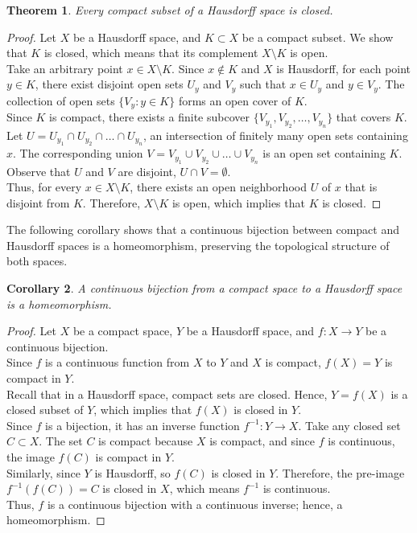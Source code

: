 \documentclass[12pt, reqno]{amsart}
\newtheorem{theorem}{Theorem}[section]
\newtheorem{corollary}[theorem]{Corollary}
\theoremstyle{definition}
\numberwithin{equation}{section}
\newcommand{\tabb}{\hspace*{1cm}}
\begin{document}
\begin{theorem}
 Every compact subset of a Hausdorff space is closed.
\end{theorem}

\begin{proof}
Let $X$ be a Hausdorff space, and $K \subset X$ be a compact subset. We show that $K$ is closed, which means that its complement $X \setminus K$ is open.\\
\tabb Take an arbitrary point $x \in X \setminus K$. Since $x \notin K$ and $X$ is Hausdorff, for each point $y \in K$, there exist disjoint open sets $U_y$ and $V_y$ such that $x \in U_y$ and $y \in V_y$. The collection of open sets $\{ V_y : y \in K \}$ forms an open cover of $K$.\\
\tabb Since $K$ is compact, there exists a finite subcover $\{ V_{y_1}, V_{y_2}, \dots, V_{y_n} \}$ that covers $K$. Let $U = U_{y_1} \cap U_{y_2} \cap \dots \cap U_{y_n}$, an intersection of finitely many open sets containing $x$. The corresponding union $V = V_{y_1} \cup V_{y_2} \cup \dots \cup V_{y_n}$ is an open set containing $K$.\\
\tabb Observe that $U$ and $V$ are disjoint, $U \cap V = \emptyset$.\\
\tabb Thus, for every $x \in X \setminus K$, there exists an open neighborhood $U$ of $x$ that is disjoint from $K$. Therefore, $X \setminus K$ is open, which implies that $K$ is closed.
\end{proof}

The following corollary shows that a continuous bijection between compact and Hausdorff spaces is a homeomorphism, preserving the topological structure of both spaces.
\begin{corollary}
A continuous bijection from a compact space to a Hausdorff space is a homeomorphism.
\end{corollary}

\begin{proof}
Let $X$ be a compact space, $Y$ be a Hausdorff space, and $f: X \to Y$ be a continuous bijection.\\
\tabb Since $f$ is a continuous function from $X$ to $Y$ and $X$ is compact, $f(X) = Y$ is compact in $Y$.\\
\tabb Recall that in a Hausdorff space, compact sets are closed. Hence, $Y = f(X)$ is a closed subset of $Y$, which implies that $f(X)$ is closed in $Y$.\\
\tabb Since $f$ is a bijection, it has an inverse function $f^{-1}: Y \to X$. Take any closed set $C \subset X$. The set $C$ is compact because $X$ is compact, and since $f$ is continuous, the image $f(C)$ is compact in $Y$.\\
\tabb Similarly, since $Y$ is Hausdorff, so $f(C)$ is closed in $Y$. Therefore, the pre-image $f^{-1}(f(C)) = C$ is closed in $X$, which means $f^{-1}$ is continuous.\\
\tabb Thus, $f$ is a continuous bijection with a continuous inverse; hence, a homeomorphism.
\end{proof}
\end{document}
